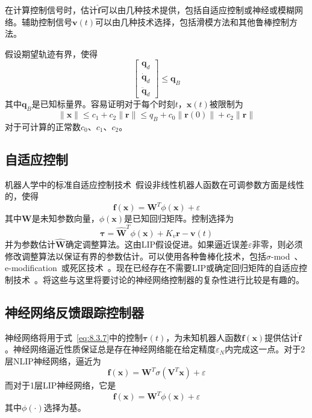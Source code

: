 \documentclass[12pt,a4paper]{ctexart}
\begin{document}
在计算控制信号时，估计$\hat{\bm{f}}$可以由几种技术提供，包括自适应控制或神经或模糊网络。辅助控制信号$\bm{v}(t)$可以由几种技术选择，包括滑模方法和其他鲁棒控制方法。

假设期望轨迹有界，使得
\begin{equation}\label{eq:8.3.9}
\begin{bmatrix} \bm{q}_d \\ \dot{\bm{q}}_d \\ \ddot{\bm{q}}_d \end{bmatrix} \leq \bm{q}_B
\end{equation}
其中$\bm{q}_B$是已知标量界。容易证明对于每个时刻$t$，$\bm{x}(t)$被限制为
\begin{equation}\label{eq:8.3.10}
\|\bm{x}\| \leq c_1 + c_2\|\bm{r}\| \leq q_B + c_0\|\bm{r}(0)\| + c_2\|\bm{r}\|
\end{equation}
对于可计算的正常数$c_0$、$c_1$、$c_2$。

\subsection{自适应控制}

机器人学中的标准自适应控制技术~\cite{craig1988,slotine1988,spong1989,lewis1993}假设非线性机器人函数在可调参数方面是线性的，使得
\begin{equation}\label{eq:8.3.11}
\bm{f}(\bm{x}) = \bm{W}^T \phi(\bm{x}) + \varepsilon
\end{equation}
其中$\bm{W}$是未知参数向量，$\phi(\bm{x})$是已知回归矩阵。控制选择为
\begin{equation}\label{eq:8.3.12}
\bm{\tau} = \hat{\bm{W}}^T \phi(\bm{x}) + K_v\bm{r} - \bm{v}(t)
\end{equation}
并为参数估计$\hat{\bm{W}}$确定调整算法。这由LIP假设促进。如果逼近误差$\varepsilon$非零，则必须修改调整算法以保证有界的参数估计。可以使用各种鲁棒化技术，包括$\sigma$-mod~\cite{ioannou1984}、e-modification~\cite{narendra1987}或死区技术~\cite{kreisselmeier1986}。现在已经存在不需要LIP或确定回归矩阵的自适应控制技术~\cite{colbaugh1994}。将这些与这里将要讨论的神经网络控制器的复杂性进行比较是有趣的。

\subsection{神经网络反馈跟踪控制器}

神经网络将用于式~\eqref{eq:8.3.7}中的控制$\bm{\tau}(t)$，为未知机器人函数$\bm{f}(\bm{x})$提供估计$\hat{\bm{f}}$。神经网络逼近性质保证总是存在神经网络能在给定精度$\varepsilon_N$内完成这一点。对于2层NLIP神经网络，逼近为
\begin{equation}\label{eq:8.3.13}
\bm{f}(\bm{x}) = \bm{W}^T \sigma(\bm{V}^T \bm{x}) + \varepsilon
\end{equation}
而对于1层LIP神经网络，它是
\begin{equation}\label{eq:8.3.14}
\bm{f}(\bm{x}) = \bm{W}^T \phi(\bm{x}) + \varepsilon
\end{equation}
其中$\phi(\cdot)$选择为基。
\end{document}
